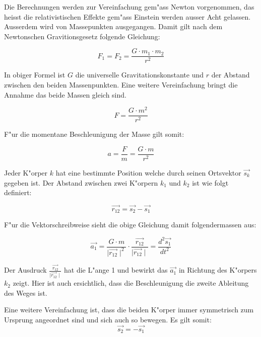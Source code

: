 \begin{refsection}
Die Berechnungen werden zur Vereinfachung gem"ass Newton vorgenommen, das heisst die relativistischen Effekte gem"ass Einstein werden ausser Acht gelassen.
Ausserdem wird von Massepunkten ausgegangen.
Damit gilt nach dem Newtonschen Gravitionsgesetz folgende Gleichung:

\begin{equation} \label{eq:newton}
F_1 = F_2=\frac{G \cdot m_1 \cdot m_2}{r^2}
\end{equation}


In obiger Formel ist $G$ die universelle Gravitationskonstante und $r$ der Abstand zwischen den beiden Massenpunkten.
Eine weitere Vereinfachung bringt die Annahme das beide Massen gleich sind.

\begin{equation}
F=\frac{G \cdot m^2}{r^2}
\end{equation}

F"ur die momentane Beschleunigung der Masse gilt somit:

\begin{equation}
a=\frac{F}{m}=\frac{G \cdot m}{r^2}
\end{equation}

Jeder K"orper $k$ hat eine bestimmte Position welche durch seinen Ortsvektor $\vec{s_k}$ gegeben ist.
Der Abstand zwischen zwei K"orpern $k_1$ und $k_2$ ist wie folgt definiert:

\begin{equation} \label{eq:abstand}
\vec{r_{12}}= \vec{s_2}-\vec{s_1}
\end{equation}

F"ur die Vektorschreibweise sieht die obige Gleichung damit folgendermassen aus:

\begin{equation} \label{eq:gravitationVektor}
\vec{a_1} =\frac{G \cdot m}{\mid \vec{r_{12}}\mid ^2}\cdot \frac{\vec{r_{12}}}{\mid \vec{r_{12}}\mid}=  \frac{d^2 \vec{s_1}}{dt^2}
\end{equation}

Der Ausdruck $\frac{\vec{r_{12}}}{\mid \vec{r_{12}}\mid}$ hat die L"ange 1 und bewirkt das $\vec{a_1}$ in Richtung des K"orpers $k_2$ zeigt.
Hier ist auch ersichtlich, dass die Beschleunigung die zweite Ableitung des Weges ist.
  
Eine weitere Vereinfachung ist, dass die beiden K"orper immer symmetrisch zum Ursprung angeordnet sind und sich auch so bewegen.
Es gilt somit:
\begin{equation}
\vec{s_2}=-\vec{s_1}
\end{equation}


\end{refsection}
